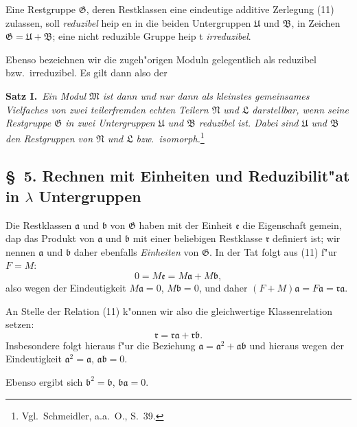 \documentclass[12pt,a4paper]{article}
\begin{document}
Eine Restgruppe $\mathfrak{G}$, deren Restklassen eine eindeutige additive Zerlegung (11) zulassen, soll \emph{reduzibel} heip en in die beiden Untergruppen $\mathfrak{U}$ und $\mathfrak{B}$, in Zeichen $\mathfrak{G} = \mathfrak{U} + \mathfrak{B}$; eine nicht reduzible Gruppe heip t \emph{irreduzibel}.

Ebenso bezeichnen wir die zugeh"origen Moduln gelegentlich als reduzibel bzw.\ irreduzibel. Es gilt dann also der

\smallskip
\noindent\textbf{Satz I.}\ \textit{Ein Modul $\mathfrak{M}$ ist dann und nur dann als kleinstes gemeinsames Vielfaches von zwei teilerfremden echten Teilern $\mathfrak{N}$ und $\mathfrak{L}$ darstellbar, wenn seine Restgruppe $\mathfrak{G}$ in zwei Untergruppen $\mathfrak{U}$ und $\mathfrak{B}$ reduzibel ist. Dabei sind $\mathfrak{U}$ und $\mathfrak{B}$ den Restgruppen von $\mathfrak{N}$ und $\mathfrak{L}$ bzw.\ isomorph.}\footnote{Vgl.\ Schmeidler, a.a.\ O., S.~39.}

\subsection*{\S\ 5. Rechnen mit Einheiten und Reduzibilit"at in $\lambda$ Untergruppen}

Die Restklassen $\mathfrak{a}$ und $\mathfrak{b}$ von $\mathfrak{G}$ haben mit der Einheit $\mathfrak{e}$ die Eigenschaft gemein, dap das Produkt von $\mathfrak{a}$ und $\mathfrak{b}$ mit einer beliebigen Restklasse $\mathfrak{r}$ definiert ist; wir nennen $\mathfrak{a}$ und $\mathfrak{b}$ daher ebenfalls \emph{Einheiten} von $\mathfrak{G}$. In der Tat folgt aus (11) f"ur $F = M$:
\[
0 = M\mathfrak{e} = M\mathfrak{a} + M\mathfrak{b},
\]
also wegen der Eindeutigkeit $M\mathfrak{a} = 0$, $M\mathfrak{b} = 0$, und daher $(F+M)\mathfrak{a} = F\mathfrak{a} = \mathfrak{r}\mathfrak{a}$.

An Stelle der Relation (11) k"onnen wir also die gleichwertige Klassenrelation setzen:
\begin{equation}
\mathfrak{r} = \mathfrak{r}\mathfrak{a} + \mathfrak{r}\mathfrak{b}. \tag{11$'$}
\end{equation}
Insbesondere folgt hieraus f"ur die Beziehung $\mathfrak{a} = \mathfrak{a}^2 + \mathfrak{a}\mathfrak{b}$ und hieraus wegen der Eindeutigkeit $\mathfrak{a}^2 = \mathfrak{a}$, $\mathfrak{a}\mathfrak{b} = 0$.

Ebenso ergibt sich $\mathfrak{b}^2 = \mathfrak{b}$, $\mathfrak{b}\mathfrak{a} = 0$.
\end{document}
